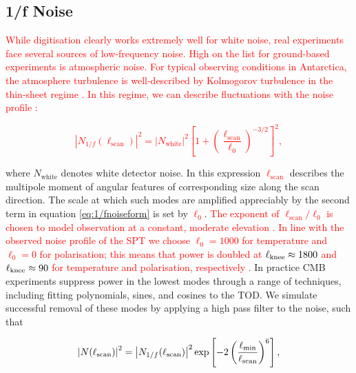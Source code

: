\documentclass[apj]{emulateapj}
\newcommand{\lknee}{\ensuremath{\ell_{\rm knee}}}
\newcommand{\lcut}{\ensuremath{\ell_{\rm min}}}
\newcommand{\changed}[1]{\textcolor{Red}{#1}}
\begin{document}
\subsection{1/f Noise}
\label{subsec:oofnoise}

\changed{While digitisation clearly works extremely well for white noise, real experiments face several sources of low-frequency noise. 
High on the list for ground-based experiments is atmospheric noise. 
For typical observing conditions in Antarctica, the atmosphere turbulence is well-described by Kolmogorov turbulence in the thin-sheet regime \citep{bussmann2005}. 
In this regime, we can describe fluctuations with the noise profile \citep{lay2000}:}

\changed{
\begin{equation} \label{eq:1/fnoiseform}
\left| N_{1/f}(\ell_{\mathrm{scan}}) \right|^2 = \left| N_{\mathrm{white}} \right|^2 \left[ 1 + \left( \frac{\ell_{\mathrm{scan}}}{\ell_0} \right)^{-3/2} \right]^2,
\end{equation}
}


where $N_{\mathrm{white}}$ denotes white detector noise. In this expression \changed{$\ell_{\mathrm{scan}}$} describes the multipole moment of angular features of corresponding size along the scan direction. The scale at which such modes are amplified appreciably by the second term in equation \ref{eq:1/fnoiseform} is set by \changed{$\ell_0$}. \changed{The exponent of $\ell_{\mathrm{scan}}/\ell_0$ is chosen to model observation at a constant, moderate elevation \citep{lay1997}. In line with the observed noise profile of the SPT we choose $\ell_0 = 1000$ for temperature and $\ell_0 = 0$ for polarisation; this means that power is doubled at $\lknee \approx 1800$ and $\lknee \approx 90$ for temperature and polarisation, respectively \citep{henning2018}.} In practice CMB experiments suppress power in the lowest modes through a range of techniques, including fitting polynomials, sines, and cosines to the TOD. We simulate successful removal of these modes by applying a high pass filter to the noise, such that

\changed{
\begin{equation} \label{eq:1/fnoiseformfinal}
\left| N (\ell_{\mathrm{scan}}) \right|^2 = \left| N_{1/f}(\ell_{\mathrm{scan}}) \right|^2 \exp\left[ -2\left( \frac{\lcut}{\ell_{\mathrm{scan}}} \right)^{6} \right],
\end{equation}
}
\end{document}
